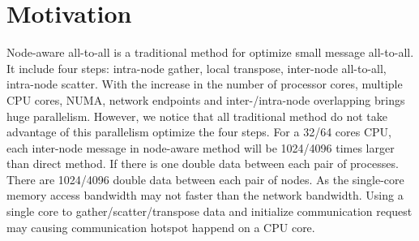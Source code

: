 \section {Motivation}
Node-aware all-to-all is a traditional method for optimize small message all-to-all.
It include four steps: intra-node gather, local transpose, inter-node all-to-all, intra-node scatter.
With the increase in the number of processor cores, multiple CPU cores, NUMA, network endpoints and inter-/intra-node overlapping brings huge parallelism.
However, we notice that all traditional method do not take advantage of this parallelism optimize the four steps.
For a 32/64 cores CPU, each inter-node message in node-aware method will be 1024/4096 times larger than direct method.
If there is one double data between each pair of processes. There are 1024/4096 double data between each pair of nodes.
As the single-core memory access bandwidth may not faster than the network bandwidth.
Using a single core to gather/scatter/transpose data and initialize communication request may causing communication hotspot happend on a CPU core.